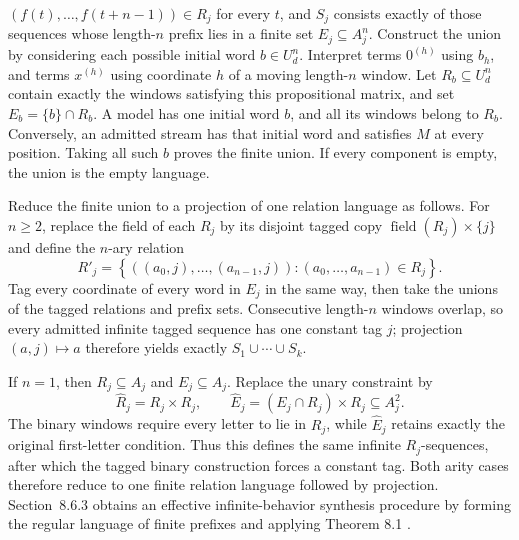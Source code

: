 \((f(t),\ldots,f(t+n-1))\in R_j\) for every \(t\), and
\(S_j\) consists exactly of those sequences whose length-\(n\) prefix lies in
a finite set \(E_j\subseteq A_j^n\).
Construct the union by considering each possible initial word
\(b\in U_d^n\).  Interpret terms \(0^{(h)}\) using \(b_h\), and
terms \(x^{(h)}\) using coordinate \(h\) of a moving length-\(n\) window.
Let \(R_b\subseteq U_d^n\) contain exactly the windows satisfying this
propositional matrix, and set \(E_b=\{b\}\cap R_b\).
A model has one initial word \(b\), and all its windows belong to
\(R_b\).  Conversely, an admitted stream has that initial word and
satisfies \(M\) at every position.  Taking all such \(b\) proves the
finite union.  If every component is empty, the union is the empty language.

Reduce the finite union to a projection of one relation language as follows.
For \(n\geq2\), replace the field of each
\(R_j\) by its disjoint tagged copy
\(\operatorname{field}(R_j)\times\{j\}\) and define the \(n\)-ary relation
\[
 R'_j
 =
 \left\{
   ((a_0,j),\ldots,(a_{n-1},j)):
   (a_0,\ldots,a_{n-1})\in R_j
 \right\}.
\]
Tag every coordinate of every word in \(E_j\) in the same way, then take the
unions of the tagged relations and prefix sets.  Consecutive length-\(n\)
windows overlap, so every admitted infinite tagged sequence has one constant
tag \(j\); projection \((a,j)\mapsto a\) therefore yields exactly
\(S_1\cup\cdots\cup S_k\).

If \(n=1\), then \(R_j\subseteq A_j\) and \(E_j\subseteq A_j\).  Replace
the unary constraint by
\[
 \widehat R_j=R_j\times R_j,
 \qquad
 \widehat E_j=(E_j\cap R_j)\times R_j\subseteq A_j^2.
\]
The binary windows require every letter to lie in \(R_j\), while
\(\widehat E_j\) retains exactly the original first-letter condition.  Thus
this defines the same infinite \(R_j\)-sequences, after which the tagged binary
construction forces a constant tag.  Both arity cases therefore reduce to
one finite relation language followed by projection.  Section~8.6.3 obtains
an effective infinite-behavior synthesis procedure by forming the regular
language of finite prefixes and applying Theorem 8.1
\cite[pp.~44--47]{Elgot1961}
\cite[pp.~558--559]{Elgot1962Errata}.

